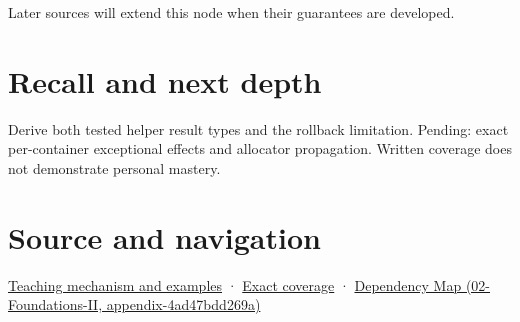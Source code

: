 Later sources will extend this node when their guarantees are developed.

\section{Recall and next depth}\label{appendix-c746afaa47d1-recall-and-next-depth}

Derive both tested helper result types and the rollback limitation. Pending: exact per-container exceptional effects and allocator propagation. Written coverage does not demonstrate personal mastery.

\section{Source and navigation}\label{appendix-c746afaa47d1-source-and-navigation}

\href{Continuous\%20Notes/Computing\%20Foundations\%20-\%20From\%20Bits\%20to\%20C++\%20and\%20Systems\%20APIs\#Failure\%20guarantees\%20shape\%20the\%20transfer\%20algorithm}{Teaching mechanism and examples} · \hyperref[appendix-fd090d982a15-m009---parts-127-147]{Exact coverage} · \href{../02-Foundations-II/main.pdf\#nameddest=appendix-4ad47bdd269a}{Dependency Map (02-Foundations-II, appendix-4ad47bdd269a)}
